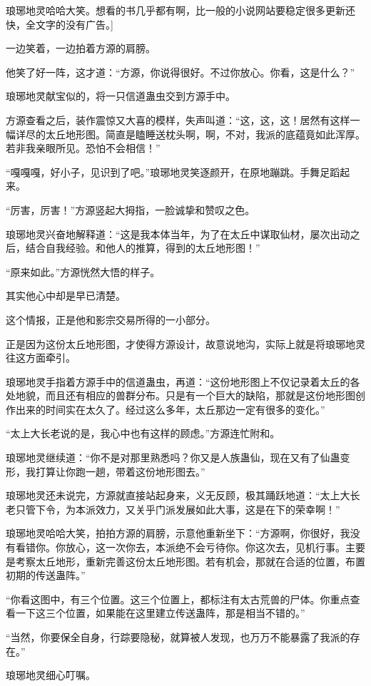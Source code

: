 \begin{this_body}
琅琊地灵哈哈大笑。想看的书几乎都有啊，比一般的小说网站要稳定很多更新还快，全文字的没有广告。]

一边笑着，一边拍着方源的肩膀。

他笑了好一阵，这才道：“方源，你说得很好。不过你放心。你看，这是什么？”

琅琊地灵献宝似的，将一只信道蛊虫交到方源手中。

方源查看之后，装作震惊又大喜的模样，失声叫道：“这，这，这！居然有这样一幅详尽的太丘地形图。简直是瞌睡送枕头啊，啊，不对，我派的底蕴竟如此浑厚。若非我亲眼所见。恐怕不会相信！”

“嘎嘎嘎，好小子，见识到了吧。”琅琊地灵笑逐颜开，在原地蹦跳。手舞足蹈起来。

“厉害，厉害！”方源竖起大拇指，一脸诚挚和赞叹之色。

琅琊地灵兴奋地解释道：“这是我本体当年，为了在太丘中谋取仙材，屡次出动之后，结合自我经验。和他人的推算，得到的太丘地形图！”

“原来如此。”方源恍然大悟的样子。

其实他心中却是早已清楚。

这个情报，正是他和影宗交易所得的一小部分。

正是因为这份太丘地形图，才使得方源设计，故意说地沟，实际上就是将琅琊地灵往这方面牵引。

琅琊地灵手指着方源手中的信道蛊虫，再道：“这份地形图上不仅记录着太丘的各处地貌，而且还有相应的兽群分布。只是有一个巨大的缺陷，那就是这份地形图创作出来的时间实在太久了。经过这么多年，太丘那边一定有很多的变化。”

“太上大长老说的是，我心中也有这样的顾虑。”方源连忙附和。

琅琊地灵继续道：“你不是对那里熟悉吗？你又是人族蛊仙，现在又有了仙蛊变形，我打算让你跑一趟，带着这份地形图去。”

琅琊地灵还未说完，方源就直接站起身来，义无反顾，极其踊跃地道：“太上大长老只管下令，为本派效力，又关乎门派发展如此大事，这是在下的荣幸啊！”

琅琊地灵哈哈大笑，拍拍方源的肩膀，示意他重新坐下：“方源啊，你很好，我没有看错你。你放心，这一次你去，本派绝不会亏待你。你这次去，见机行事。主要是考察太丘地形，重新完善这份太丘地形图。若有机会，那就在合适的位置，布置初期的传送蛊阵。”

“你看这图中，有三个位置。这三个位置上，都标注有太古荒兽的尸体。你重点查看一下这三个位置，如果能在这里建立传送蛊阵，那是相当不错的。”

“当然，你要保全自身，行踪要隐秘，就算被人发现，也万万不能暴露了我派的存在。”

琅琊地灵细心叮嘱。


\end{this_body}
